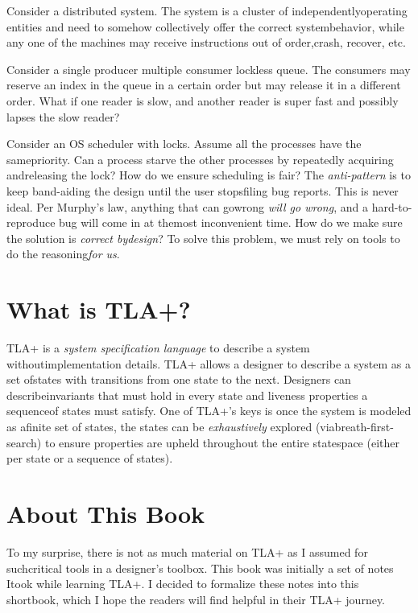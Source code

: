Consider a distributed system. The system is a cluster of independentlyoperating
entities and need to somehow collectively offer the correct systembehavior,
while any one of the machines may receive instructions out of order,crash,
recover, etc. \newline

Consider a single producer multiple consumer lockless queue. The consumers may
reserve an index in the queue in a certain order but may release it in a
different order. What if one reader is slow, and another reader is super fast
and possibly lapses the slow reader? \newline

Consider an OS scheduler with locks. Assume all the processes have the
samepriority. Can a process starve the other processes by repeatedly acquiring
andreleasing the lock? How do we ensure scheduling is fair?\newline
The \textit{anti-pattern} is to keep band-aiding the design until the user
stopsfiling bug reports. This is never ideal. Per Murphy's law, anything that
can gowrong \textit{will go wrong}, and a hard-to-reproduce bug will come in at
themost inconvenient time. How do we make sure the solution is \textit{correct
bydesign}? To solve this problem, we must rely on tools to do the
reasoning\textit{for us}.

\section{What is TLA+?}

TLA+ is a \textit{system specification language} to describe a system
withoutimplementation details. TLA+ allows a designer to describe a system as a
set ofstates with transitions from one state to the next. Designers can
describeinvariants that must hold in every state and liveness properties a
sequenceof states must satisfy. One of TLA+'s keys is once the system is modeled
as afinite set of states, the states can be \textit{exhaustively} explored
(viabreath-first-search) to ensure properties are upheld throughout the entire
statespace (either per state or a sequence of states).

\section{About This Book}
To my surprise, there is not as much material on TLA+ as I assumed for
suchcritical tools in a designer's toolbox. This book was initially a set of
notes Itook while learning TLA+. I decided to formalize these notes into this
shortbook, which I hope the readers will find helpful in their TLA+
journey.\newline

